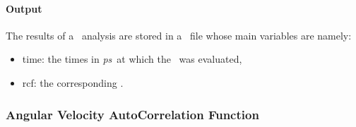 \documentclass[a4paper,11pt]{report}
\newcommand{\ps}{\textit{ps}}
\begin{document}
\paragraph{Output\\}
The results of a \RCF\ analysis are stored in a \NetCDF\ file whose main variables are namely:
\begin{itemize}
\item time: the times in \ps\ at which the \RCF\ was evaluated,
\item rcf: the corresponding \RCF .
\end{itemize}

\subsubsection{Angular Velocity AutoCorrelation Function}
\label{avacf}
\end{document}
